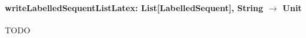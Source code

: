 \documentclass[a4paper,11pt]{article}
\begin{document}
\begin{appendix}
\paragraph{\textbf{writeLabelledSequentListLatex: List[LabelledSequent], String $\rightarrow$ Unit}}
{\color{red}TODO}


% 
% 
% 
% 
% 
% 
% 
% 
% 
% 

\end{appendix}
\end{document}
